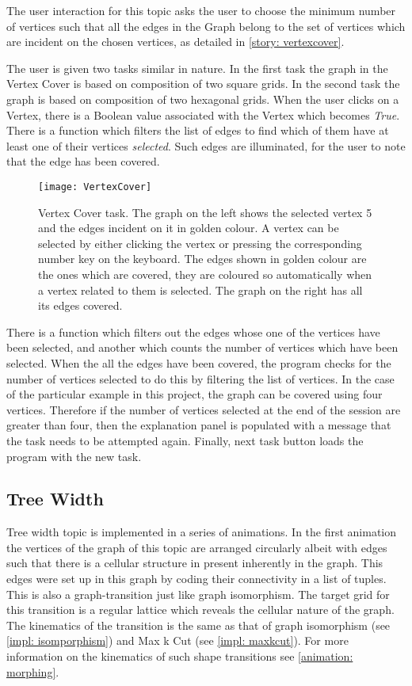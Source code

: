 The user interaction for this topic asks the user to choose the minimum number
of vertices such that all the edges in the Graph belong to the set of vertices
which are incident on the chosen vertices, as detailed in \autoref{story: vertexcover}.

The user is given two tasks similar in nature. In the first task the graph in
the Vertex Cover is based on composition of two square grids. In the second
task the graph is based on composition of two hexagonal grids.  When the user
clicks on a Vertex, there is a Boolean value associated with the Vertex which
becomes \emph{True}. There is a function which filters the list of edges to
find which of them have at least one of their vertices \emph{selected}. Such
edges are illuminated, for the user to note that the edge has been covered.

\begin{figure}[ht]
\centering
\texttt{[image: VertexCover]}
\caption{
        Vertex Cover task. The graph on the left shows the selected vertex 5
        and the edges incident on it in golden colour. A vertex can be selected
        by either clicking the vertex or pressing the corresponding number key
        on the keyboard. The edges shown in golden colour are the ones which are
        covered, they are coloured so automatically when a vertex related to
        them is selected. The graph on the right has all its edges covered.
        }
\label{animationfigure: vertexCover}
\end{figure}

There is a function which filters out the edges whose one of the vertices
have been selected, and another which counts the number of vertices which
have been selected.  When the all the edges have been covered, the program
checks for the number of vertices selected to do this by filtering the list of
vertices. In the case of the particular example in this project, the graph can
be covered using four vertices. Therefore if the number of vertices selected at
the end of the session are greater than four, then the explanation panel is
populated with a message that the task needs to be attempted again. Finally, next task button loads the program with the new task.

\subsection{Tree Width}
Tree width topic is implemented in a series of animations.  In the first
animation the vertices of the graph of this topic are arranged circularly
albeit with edges such that there is a cellular structure in present inherently
in the graph. This edges were set up in this graph by coding their connectivity
in a list of tuples.
This is also a graph-transition just like graph isomorphism. The target grid
for this transition is a regular lattice which reveals the cellular nature of
the graph. The kinematics of the transition is the same as that of graph
isomorphism (see \autoref{impl: isomporphism}) and Max k Cut (see
\autoref{impl: maxkcut}). For more information on the kinematics of such shape
transitions see \autoref{animation: morphing}.

